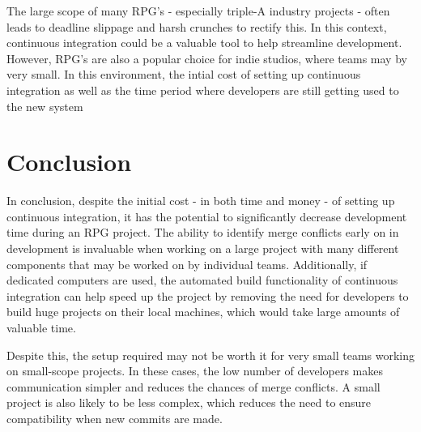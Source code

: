 \documentclass{scrartcl}
\begin{document}
The large scope of many RPG's - especially triple-A industry projects - often leads to deadline slippage and harsh crunches to rectify this. In this context, continuous integration could be a valuable tool to help streamline development. However, RPG's are also a popular choice for indie studios, where teams may by very small. In this environment, the intial cost of setting up continuous integration as well as the time period where developers are still getting used to the new system 


\section{Conclusion}

In conclusion, despite the initial cost - in both time and money - of setting up continuous integration, it has the potential to significantly decrease development time during an RPG project. The ability to identify merge conflicts early on in development is invaluable when working on a large project with many different components that may be worked on by individual teams. Additionally, if dedicated computers are used, the automated build functionality of continuous integration can help speed up the project by removing the need for developers to build huge projects on their local machines, which would take large amounts of valuable time. \cite{gamasutraCIprocess}

Despite this, the setup required may not be worth it for very small teams working on small-scope projects. In these cases, the low number of developers makes communication simpler and reduces the chances of merge conflicts. A small project is also likely to be less complex, which reduces the need to ensure compatibility when new commits are made. 





\end{document}
